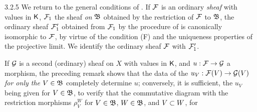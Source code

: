 \documentclass[../main.tex]{subfiles}
\begin{document}
\begin{env}{3.2.5}
We return to the general conditions of . If $\mathcal{F}$ is an ordinary
\emph{sheaf} with values in $\mathsf{K}$, $\mathcal{F}_1$ the sheaf \emph{on} $\mathfrak{B}$ obtained
by the restriction of $\mathcal{F}$ to $\mathfrak{B}$, the ordinary sheaf $\mathcal{F}_1'$
obtained from $\mathcal{F}_1$ by the procedure of  is canonically
isomorphic to $\mathcal{F}$, by virtue of the condition (F) and the uniqueness properties
of the projective limit. We identify the ordinary sheaf $\mathcal{F}$ with $\mathcal{F}_1'$.

If $\mathcal{G}$ is a second (ordinary) sheaf on $X$ with values in $\mathsf{K}$, and
$u:\mathcal{F}\to\mathcal{G}$ a morphism, the preceding remark shows that the data of
the $u_V:\mathcal{F}(V)\to\mathcal{G}(V)$ \emph{for only the $V\in\mathfrak{B}$} completely
determine $u$; conversely, it is sufficient, the $u_V$ being given for $V\in\mathfrak{B}$,
to verify that the commutative diagram with the restriction morphisms $\rho_V^W$ for
$V\in\mathfrak{B}$, $W\in\mathfrak{B}$, and $V\subset W$, for
\end{env}

\end{document}
